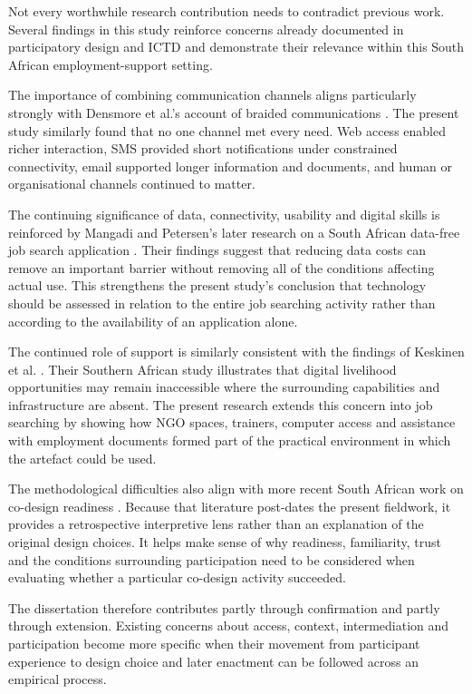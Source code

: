 Not every worthwhile research contribution needs to contradict previous work. Several findings in this study reinforce concerns already documented in participatory design and ICTD and demonstrate their relevance within this South African employment-support setting.

The importance of combining communication channels aligns particularly strongly with Densmore et al.'s account of braided communications \cite{densmore2013}. The present study similarly found that no one channel met every need. Web access enabled richer interaction, SMS provided short notifications under constrained connectivity, email supported longer information and documents, and human or organisational channels continued to matter.

The continuing significance of data, connectivity, usability and digital skills is reinforced by Mangadi and Petersen's later research on a South African data-free job search application \cite{mangadi2024}. Their findings suggest that reducing data costs can remove an important barrier without removing all of the conditions affecting actual use. This strengthens the present study's conclusion that technology should be assessed in relation to the entire job searching activity rather than according to the availability of an application alone.

The continued role of support is similarly consistent with the findings of Keskinen et al. \cite{keskinen2022}. Their Southern African study illustrates that digital livelihood opportunities may remain inaccessible where the surrounding capabilities and infrastructure are absent. The present research extends this concern into job searching by showing how NGO spaces, trainers, computer access and assistance with employment documents formed part of the practical environment in which the artefact could be used.

The methodological difficulties also align with more recent South African work on co-design readiness \cite{till2026}. Because that literature post-dates the present fieldwork, it provides a retrospective interpretive lens rather than an explanation of the original design choices. It helps make sense of why readiness, familiarity, trust and the conditions surrounding participation need to be considered when evaluating whether a particular co-design activity succeeded.

The dissertation therefore contributes partly through confirmation and partly through extension. Existing concerns about access, context, intermediation and participation become more specific when their movement from participant experience to design choice and later enactment can be followed across an empirical process.


